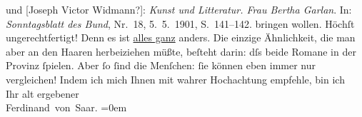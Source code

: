 \begin{ledgroupsized}[t]{13cm}
{{{                  und [Joseph Victor Widmann?]: \emph{Kunst und Litteratur. Frau Bertha Garlan}. In:
                        \emph{Sonntagsblatt des Bund}, Nr. 18,
                        5. 5. 1901, S. 141–142.}}}\label{K_L01130_1h} bringen wollen. Höchſt
               ungerechtfertigt! Denn es ist \uline{alles ganz} anders. Die
               einzige Ähnlichkeit, die man aber an den Haaren herbeiziehen müßte, beſteht darin:
               dſs beide Romane in der Provinz ſpielen. Aber ſo ſind die Menſchen: ſie können eben
               immer nur vergleichen! \pend
           \pstart
           Indem ich mich Ihnen mit wahrer Hochachtung empfehle, bin ich{\\[\baselineskip]}Ihr alt ergebener{\\[\baselineskip]}\spacefill\mbox{Ferdinand von Saar.}\pend
           \leftskip=0em{}
         
         \endnumbering{}\end{ledgroupsized}  \newcommand{\dateiname}{L01130}\newcommand{\titel}{Ferdinand von Saar an Arthur Schnitzler, 19. 6. 1901}\newcommand{\editorInnen}{Martin Anton Müller und Gerd-Hermann Susen}
      
